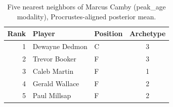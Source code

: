 \begin{table}[htbp]
  \centering\small
  \begin{tabular}{rllc}
    \toprule
    Rank & Player & Position & Archetype \\
    \midrule
    1 & Dewayne Dedmon & C & 3 \\
    2 & Trevor Booker & F & 3 \\
    3 & Caleb Martin & F & 1 \\
    4 & Gerald Wallace & F & 2 \\
    5 & Paul Millsap & F & 2 \\
    \bottomrule
  \end{tabular}
  \caption{Five nearest neighbors of Marcus Camby (peak_age modality), Procrustes-aligned posterior mean.}
  \label{tab:Marcus_Camby_neighbors_peak_age}
\end{table}

